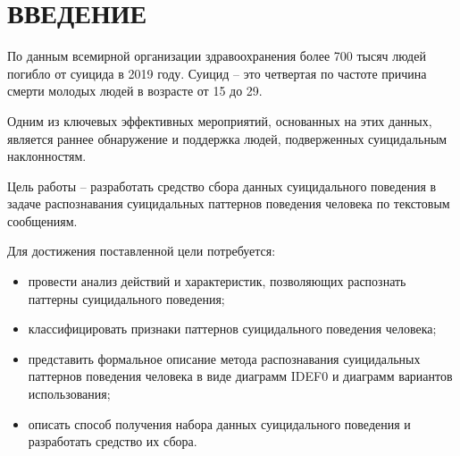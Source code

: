 \section*{ВВЕДЕНИЕ}

По данным всемирной организации здравоохранения более 700 тысяч людей погибло от суицида в 2019 году. Суицид -- это четвертая по частоте причина смерти молодых людей в возрасте от 15 до 29. \cite{suicideVOZ}

Одним из ключевых эффективных мероприятий, основанных на этих данных, является раннее обнаружение и поддержка людей, подверженных суицидальным наклонностям.

Цель работы -- разработать средство сбора данных суицидального поведения в задаче распознавания суицидальных паттернов поведения человека по текстовым сообщениям.

Для достижения поставленной цели потребуется:
\begin{itemize}
	\item провести анализ действий и характеристик, позволяющих распознать паттерны суицидального поведения;
	\item классифицировать признаки паттернов суицидального поведения человека;
	\item представить формальное описание метода распознавания суицидальных паттернов поведения человека в виде диаграмм IDEF0 и диаграмм вариантов использования;
	\item описать способ получения набора данных суицидального поведения и разработать средство их сбора.
\end{itemize}

\pagebreak